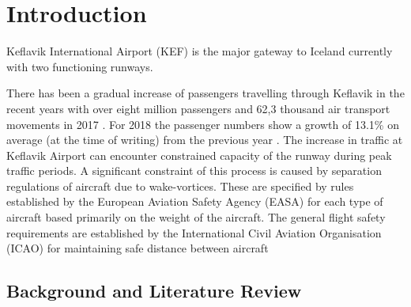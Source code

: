 \chapter{Introduction\label{cha:introduction}}

Keflavik International Airport (KEF) is the major gateway to Iceland currently with two functioning runways. 

There has been a gradual increase of passengers travelling through Keflavik in the recent years with over eight million passengers and 62,3 thousand air transport movements in 2017 \cite{isavia_facts_2017}. For 2018 the passenger numbers show a growth of 13.1\% on average (at the time of writing) from the previous year \cite{isavia_pass_statistics_2018}. The increase in traffic at Keflavik Airport can encounter constrained capacity of the runway during peak traffic periods. 
A significant constraint of this process is caused by separation regulations of aircraft due to wake-vortices. These are specified by rules established by the European Aviation Safety Agency (EASA)  for each type of aircraft based primarily on the weight of the aircraft. The general flight safety requirements are established by the International Civil Aviation Organisation (ICAO) for maintaining safe distance between aircraft

\section{Background and Literature Review}



